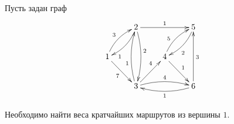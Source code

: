 \begin{exampl}
    Пусть задан граф 
    \[    
        {\xymatrix{
            *{}
                &2 \ar@{->}[rr]^1 \ar@{->}@/^/[dd]^(.4)2 \ar@{->}@/^/[dl]^(.75)1
                    &*{}
                        &5 \ar@{->}@/^/[dl]^(.6)2
                            \\
            1 \ar@{->}@/^/[ur]^3 \ar@{->}[dr]_7
                &*{}
                    &4 \ar@{->}@/^/[ur]^(.4)5 \ar@{->}[dr]^1
                        &*{}
                            \\
            *{}
                &3 \ar@{->}@/^/[uu]^(.4)1 \ar@{->}[ur]^(.65)4 \ar@{->}@/^/[rr]^4
                    &*{}
                        &6 \ar@{->}@/^/[ll]^1 \ar@{->}[uu]_3
        }}
    \]    
    
    Необходимо найти веса кратчайших маршрутов из вершины $1$.
\end{exampl}
